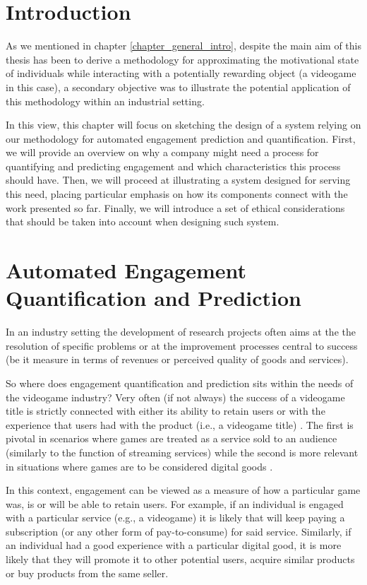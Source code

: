 \section{Introduction}
\label{industry_needs}
As we mentioned in chapter \ref{chapter_general_intro}, despite the main aim of this thesis has been to derive a methodology for approximating the motivational state of individuals while interacting with a potentially rewarding object (a videogame in this case), a secondary objective was to illustrate the potential application of this methodology within an industrial setting. 

In this view, this chapter will focus on sketching the design of a system relying on our methodology for automated engagement prediction and quantification. First, we will provide an overview on why a company might need a process for quantifying and predicting engagement and which characteristics this process should have. Then, we will proceed at illustrating a system designed for serving this need, placing particular emphasis on how its components connect with the work presented so far. Finally, we will introduce a set of ethical considerations that should be taken into account when designing such system.

\section{Automated Engagement Quantification and Prediction}
\label{industry_needs}
In an industry setting the development of research projects often aims at the the resolution of specific problems or at the improvement processes central to success (be it measure in terms of revenues or perceived quality of goods and services). 

So where does engagement quantification and prediction sits within the needs of the videogame industry? Very often (if not always) the success of a videogame title is strictly connected with either its ability to retain users or with the experience that users had with the product (i.e., a videogame title) \cite{amit2001value, alomari2016mobile}. The first is pivotal in scenarios where games are treated as a service sold to an audience (similarly to the function of streaming services) while the second is more relevant in situations where games are to be considered digital goods \cite{amit2001value, alomari2016mobile}. 

In this context, engagement can be viewed as a measure of how a particular game was, is or will be able to retain users. For example, if an individual is engaged with a particular service (e.g., a videogame) it is likely that will keep paying a subscription (or any other form of pay-to-consume) for said service. Similarly, if an individual had a good experience with a particular digital good, it is more likely that they will promote it to other potential users, acquire similar products or buy products from the same seller.  


